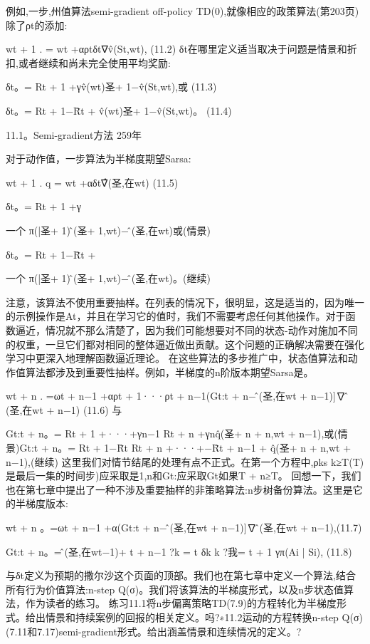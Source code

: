 例如,一步,州值算法semi-gradient off-policy TD(0),就像相应的政策算法(第203页)除了ρt的添加:

wt + 1
.
= wt +αρtδt∇v̂(St,wt), 					(11.2)
δt在哪里定义适当取决于问题是情景和折扣,或者继续和尚未完全使用平均奖励:

δt。= Rt + 1 +γv̂(wt)圣+ 1−v̂(St,wt),或 					(11.3)


δt。= Rt + 1−R̄t + v̂(wt)圣+ 1−v̂(St,wt)。 					(11.4)

11.1。Semi-gradient方法 					259年



对于动作值，一步算法为半梯度期望Sarsa:

wt + 1
.
q = wt +αδt∇̂(圣,在wt) 					(11.5)

δt。= Rt + 1 +γ

一个
π(|圣+ 1)问̂(圣+ 1,wt)−问̂(圣,在wt)或(情景)


δt。= Rt + 1−R̄t +

一个
π(|圣+ 1)问̂(圣+ 1,wt)−问̂(圣,在wt)。(继续)

注意，该算法不使用重要抽样。在列表的情况下，很明显，这是适当的，因为唯一的示例操作是At，并且在学习它的值时，我们不需要考虑任何其他操作。对于函数逼近，情况就不那么清楚了，因为我们可能想要对不同的状态-动作对施加不同的权重，一旦它们都对相同的整体逼近做出贡献。这个问题的正确解决需要在强化学习中更深入地理解函数逼近理论。
在这些算法的多步推广中，状态值算法和动作值算法都涉及到重要性抽样。例如，半梯度的n阶版本期望Sarsa是。

wt + n
.
=ωt + n−1 +αρt + 1···ρt + n−1(Gt:t + n−问̂(圣,在wt + n−1)]∇问̂(圣,在wt + n−1)
(11.6)
与

Gt:t + n。= Rt + 1 +···+γn−1 Rt + n +γnq̂(圣+ n + n,wt + n−1),或(情景)Gt:t + n。= Rt + 1−R̄t Rt + n +···+−R̄t + n−1 + q̂(圣+ n + n,wt + n−1),(继续)
这里我们对情节结尾的处理有点不正式。在第一个方程中,ρks k≥T(T)是最后一集的时间步)应采取是1,n和Gt:应采取Gt如果T + n≥T。
回想一下，我们也在第七章中提出了一种不涉及重要抽样的非策略算法:n步树备份算法。这里是它的半梯度版本:

wt + n
。=ωt + n−1 +α(Gt:t + n−问̂(圣,在wt + n−1)]∇问̂(圣,在wt + n−1),(11.7)

Gt:t + n。=问̂(圣,在wt−1)+
t + n−1 ?k = t
δk
k ?我= t + 1
γπ(Ai | Si), 					(11.8)

与δt定义为预期的撒尔沙这个页面的顶部。我们也在第七章中定义一个算法,结合所有行为价值算法:n-step Q(σ)。我们将该算法的半梯度形式，以及n步状态值算法，作为读者的练习。
练习11.1将n步偏离策略TD(7.9)的方程转化为半梯度形式。给出情景和持续案例的回报的相关定义。吗?∗11.2运动的方程转换n-step Q(σ)(7.11和7.17)semi-gradient形式。给出涵盖情景和连续情况的定义。?

